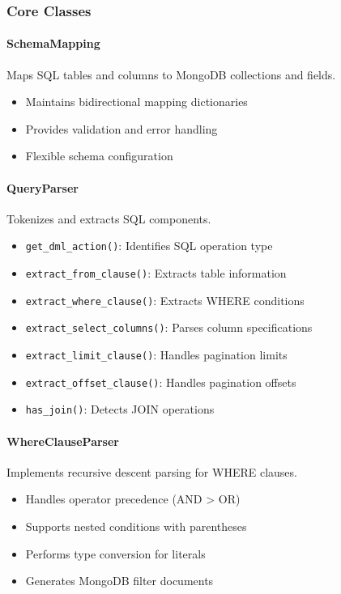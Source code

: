 \documentclass[12pt,a4paper]{article}
\begin{document}
\subsubsection{Core Classes}

\paragraph{SchemaMapping}
Maps SQL tables and columns to MongoDB collections and fields.
\begin{itemize}
    \item Maintains bidirectional mapping dictionaries
    \item Provides validation and error handling
    \item Flexible schema configuration
\end{itemize}

\paragraph{QueryParser}
Tokenizes and extracts SQL components.
\begin{itemize}
    \item \texttt{get\_dml\_action()}: Identifies SQL operation type
    \item \texttt{extract\_from\_clause()}: Extracts table information
    \item \texttt{extract\_where\_clause()}: Extracts WHERE conditions
    \item \texttt{extract\_select\_columns()}: Parses column specifications
    \item \texttt{extract\_limit\_clause()}: Handles pagination limits
    \item \texttt{extract\_offset\_clause()}: Handles pagination offsets
    \item \texttt{has\_join()}: Detects JOIN operations
\end{itemize}

\paragraph{WhereClauseParser}
Implements recursive descent parsing for WHERE clauses.
\begin{itemize}
    \item Handles operator precedence (AND > OR)
    \item Supports nested conditions with parentheses
    \item Performs type conversion for literals
    \item Generates MongoDB filter documents
\end{itemize}
\end{document}
